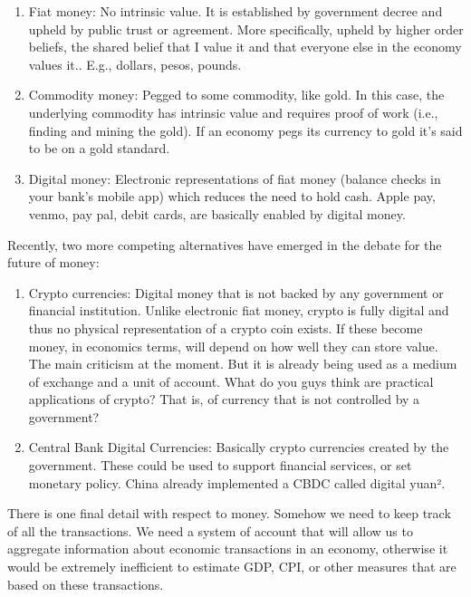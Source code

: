 \documentclass[10pt]{article}
\begin{document}
\begin{enumerate}
  \item Fiat money: No intrinsic value. It is established by government decree and upheld by public trust or agreement. More specifically, upheld by higher order beliefs, the shared belief that I value it and that everyone else in the economy values it.. E.g., dollars, pesos, pounds.
  \item Commodity money: Pegged to some commodity, like gold. In this case, the underlying commodity has intrinsic value and requires proof of work (i.e., finding and mining the gold). If an economy pegs its currency to gold it's said to be on a gold standard.
  \item Digital money: Electronic representations of fiat money (balance checks in your bank's mobile app) which reduces the need to hold cash. Apple pay, venmo, pay pal, debit cards, are basically enabled by digital money.
\end{enumerate}

Recently, two more competing alternatives have emerged in the debate for the future of money:

\begin{enumerate}
  \item Crypto currencies: Digital money that is not backed by any government or financial institution. Unlike electronic fiat money, crypto is fully digital and thus no physical representation of a crypto coin exists. If these become money, in economics terms, will depend on how well they can store value. The main criticism at the moment. But it is already being used as a medium of exchange and a unit of account. What do you guys think are practical applications of crypto? That is, of currency that is not controlled by a government?
  \item Central Bank Digital Currencies: Basically crypto currencies created by the government. These could be used to support financial services, or set monetary policy. China already implemented a CBDC called digital yuan².
\end{enumerate}

There is one final detail with respect to money. Somehow we need to keep track of all the transactions. We need a system of account that will allow us to aggregate information about economic transactions in an economy, otherwise it would be extremely inefficient to estimate GDP, CPI, or other measures that are based on these transactions.
\end{document}
